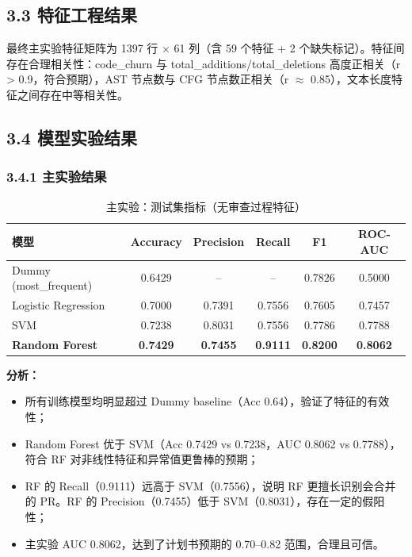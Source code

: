 \documentclass{experimentreport}
\begin{document}
{\subsection*{3.3 特征工程结果}

最终主实验特征矩阵为 1397 行 $\times$ 61 列（含 59 个特征 + 2 个缺失标记）。特征间存在合理相关性：code\_churn 与 total\_additions/total\_deletions 高度正相关（r > 0.9，符合预期），AST 节点数与 CFG 节点数正相关（r $\approx$ 0.85），文本长度特征之间存在中等相关性。

\subsection*{3.4 模型实验结果}

\subsubsection*{3.4.1 主实验结果}

\begin{table}[ht]
\centering
\caption{主实验：测试集指标（无审查过程特征）}
\begin{tabular}{|l|c|c|c|c|c|}
\hline
\textbf{模型} & \textbf{Accuracy} & \textbf{Precision} & \textbf{Recall} & \textbf{F1} & \textbf{ROC-AUC} \\
\hline
Dummy (most\_frequent) & 0.6429 & -- & -- & 0.7826 & 0.5000 \\
\hline
Logistic Regression & 0.7000 & 0.7391 & 0.7556 & 0.7605 & 0.7457 \\
\hline
SVM & 0.7238 & 0.8031 & 0.7556 & 0.7786 & 0.7788 \\
\hline
\textbf{Random Forest} & \textbf{0.7429} & \textbf{0.7455} & \textbf{0.9111} & \textbf{0.8200} & \textbf{0.8062} \\
\hline
\end{tabular}
\end{table}

\textbf{分析：}
\begin{itemize}
    \item 所有训练模型均明显超过 Dummy baseline（Acc 0.64），验证了特征的有效性；
    \item Random Forest 优于 SVM（Acc 0.7429 vs 0.7238，AUC 0.8062 vs 0.7788），符合 RF 对非线性特征和异常值更鲁棒的预期；
    \item RF 的 Recall（0.9111）远高于 SVM（0.7556），说明 RF 更擅长识别会合并的 PR。RF 的 Precision（0.7455）低于 SVM（0.8031），存在一定的假阳性；
    \item 主实验 AUC 0.8062，达到了计划书预期的 0.70--0.82 范围，合理且可信。
\end{itemize}

}
\end{document}

